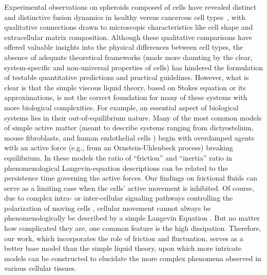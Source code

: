 \documentclass[%
reprint,
amsmath,amssymb,
aps,
]{revtex4-2}
\begin{document}
	
Experimental observations on spheroids composed of cells have revealed distinct and distinctive fusion dynamics in healthy versus cancerous cell types~\cite{grosserCellNucleusShape2021a, koshelevaCellSpheroidFusion2020a}, with qualitative connections drawn to microscopic characteristics like cell shape and extracellular matrix composition. Although these qualitative comparisons have offered valuable insights into the physical differences between cell types, the absence of adequate theoretical frameworks (made more daunting by the clear, system-specific and non-universal properties of cells) has hindered the formulation of testable quantitative predictions and practical guidelines. However, what is clear is that the simple viscous liquid theory, based on Stokes equation or its approximations, is not the correct foundation for many of these systems with more biological complexities. For example, an essential aspect of biological systems lies in their out-of-equilibrium nature. Many of the most common models of simple active matter (meant to describe systems ranging from dictyostelium, mouse fibroblasts, and human endothelial cells \cite{selmeczi2008cell,dunn1987unified,stokes1991migration}) begin with overdamped agents with an active force (e.g., from an Ornstein-Uhlenbeck process) breaking equilibrium. In these models the ratio of ``friction'' and ``inertia'' ratio in phenomenological Langevin-equation descriptions can be related to the persistence time governing the active forces. Our findings on frictional fluids can serve as a limiting case when the cells' active movement is inhibited. Of course, due to complex intra- or inter-cellular signaling pathways controlling the polarization of moving cells \cite{skoge2014cellular, yue2018minimal}, cellular movement cannot always be phenomenologically be described by a simple Langevin Equation \cite{wu2014three, nousi2021single}. But no matter how complicated they are, one common feature is the high dissipation. Therefore, our work, which incorporates the role of friction and fluctuation, serves as a better base model than the simple liquid theory, upon which more intricate models can be constructed to elucidate the more complex phenomena observed in various cellular tissues.
	
\end{document}
